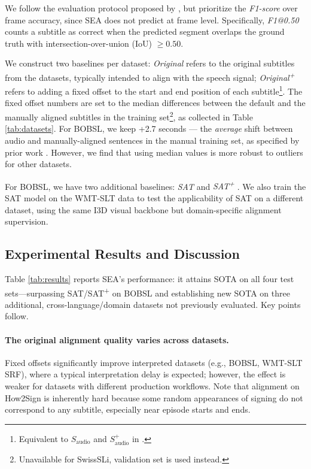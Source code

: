 \documentclass[11pt]{article}
\begin{document}
We follow the evaluation protocol proposed by \citet{bull2021aligning}, but prioritize the \textit{F1-score} over frame accuracy, since SEA does not predict at frame level. 
Specifically, \textit{F1@0.50} counts a subtitle as correct when the predicted segment overlaps the ground truth with intersection-over-union (IoU) $\geq 0.50$.

We construct two baselines per dataset: 
\textit{Original} refers to the original subtitles from the datasets, typically intended to align with the speech signal; \textit{Original\textsuperscript{+}} refers to adding a fixed offset to the start and end position of each subtitle\footnote{Equivalent to $S_{\text{audio}}$ and $S_{\text{audio}}^{+}$ in \citet{bull2021aligning}.}. 
The fixed offset numbers are set to the median differences between the default and the manually aligned subtitles in the training set\footnote{Unavailable for SwissSLi, validation set is used instead.}, as collected in Table \ref{tab:datasets}.
For BOBSL, we keep +2.7 seconds — the \emph{average} shift between audio and manually-aligned sentences in the manual training set, as specified by prior work \cite{dataset:albanie2021bobsl}. However, we find that using median values is more robust to outliers for other datasets.


For BOBSL, we have two additional baselines: \textit{SAT} \citep{bull2021aligning} and  \textit{SAT\textsuperscript{+}} \citep{jang2025deep}. We also train the SAT model on the WMT-SLT data to test the applicability of SAT on a different dataset, using the same I3D visual backbone but domain-specific alignment supervision.

\subsection{Experimental Results and Discussion}
\label{sec:results}

Table \ref{tab:results} reports SEA’s performance: it attains SOTA on all four test sets—surpassing SAT/SAT\textsuperscript{+} on BOBSL and establishing new SOTA on three additional, cross-language/domain datasets not previously evaluated. Key points follow.

\paragraph{The original alignment quality varies across datasets.}
Fixed offsets significantly improve interpreted datasets (e.g., BOBSL, WMT-SLT SRF), where a typical interpretation delay is expected; however, the effect is weaker for datasets with different production workflows.
Note that alignment on How2Sign is inherently hard because some random appearances of signing do not correspond to any subtitle, especially near episode starts and ends.
\end{document}
